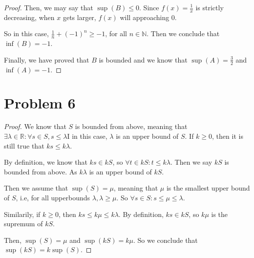 \documentclass[12pt]{article}
\begin{document}
\begin{proof}
    \vspace*{0.3cm}
    Then, we may say that $\sup(B) \leq 0$. Since $f(x) = \displaystyle \frac{1}{x}$ is strictly
    decreasing, when $x$ gets larger, $f(x)$ will approaching 0.

    \vspace*{0.3cm}
    So in this case, $\displaystyle \frac{1}{n}+(-1)^n \geq -1$, for all $ n \in \mathbb{N}$.
    Then we conclude that $\inf(B) = -1$.

    \vspace*{0.3cm}
    Finally, we have proved that $B$ is bounded and we
    know that $\sup(A) = \displaystyle \frac{3}{2}$
    and $\inf(A) = -1$.

\end{proof}

\newpage
\section*{Problem 6}

\begin{proof}
    We know that $S$ is bounded from above, meaning that $\exists \lambda \in \mathbb{R} :
    \forall s \in S, s \leq \lambda$I in this case, $\lambda$ is an upper bound of $S$. If $ k \geq 0$, 
    then it is still true that $ ks \leq k\lambda$.

    \vspace*{0.3cm}
    By definition, we know that $ ks \in kS$, so $\forall t \in kS  :   t \leq k\lambda$.
    Then we say $kS$ is bounded from above. As $k\lambda$ is an upper bound of $kS$.

    \vspace*{0.3cm}
    Then we assume that $\sup(S) = \mu$, meaning that $\mu$ is the smallest upper bound of $S$,
    i.e, for all upperbounds $\lambda, \lambda \geq \mu$.
    So $\forall s \in S : s \leq \mu \leq \lambda$.

    \vspace*{0.3cm}
    Similarily, if $k \geq 0$, then $ks \leq k\mu \leq k\lambda$. By definition, 
    $ks \in kS $, so $k\mu$ is the supremum of $kS$.

    \vspace*{0.3cm}
    Then, $\sup(S) = \mu$ and $\sup(kS) = k\mu$. So we conclude that
    $\sup(kS) = k\sup(S)$.





    


\end{proof}
\end{document}
